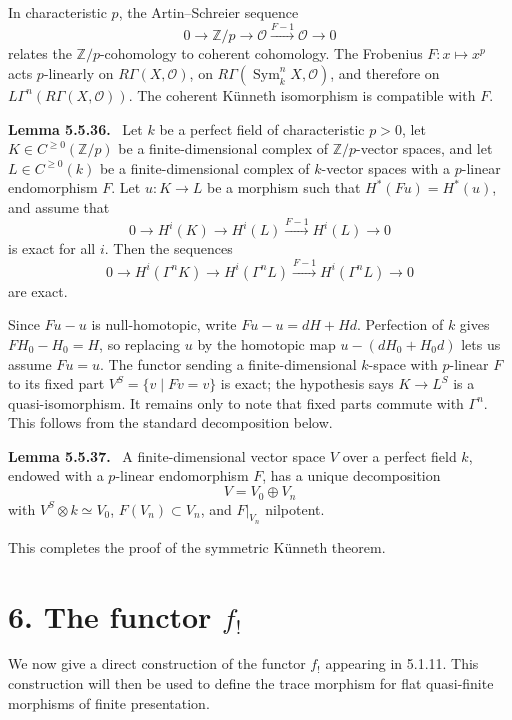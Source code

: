 \documentclass[12pt]{article}
\newcommand{\Oo}{\mathcal O}
\newcommand{\Zz}{\mathbb Z}
\DeclareMathOperator{\Sym}{Sym}
\newenvironment{statement}[1]{\par\medskip\noindent\textbf{#1.}\ }{\par\medskip}
\begin{document}
In characteristic \(p\), the Artin--Schreier sequence
\[
0\to \Zz/p\to\Oo\xrightarrow{F-1}\Oo\to0
\]
relates the \(\Zz/p\)-cohomology to coherent cohomology. The Frobenius \(F:x\mapsto x^p\) acts \(p\)-linearly on \(R\Gamma(X,\Oo)\), on \(R\Gamma(\Sym^n_kX,\Oo)\), and therefore on \(L\Gamma^n(R\Gamma(X,\Oo))\). The coherent K\"unneth isomorphism is compatible with \(F\).

\begin{statement}{Lemma 5.5.36}
Let \(k\) be a perfect field of characteristic \(p>0\), let \(K\in C^{\ge0}(\Zz/p)\) be a finite-dimensional complex of \(\Zz/p\)-vector spaces, and let \(L\in C^{\ge0}(k)\) be a finite-dimensional complex of \(k\)-vector spaces with a \(p\)-linear endomorphism \(F\). Let \(u:K\to L\) be a morphism such that \(H^*(Fu)=H^*(u)\), and assume that
\[
0\to H^i(K)\to H^i(L)\xrightarrow{F-1}H^i(L)\to0
\]
is exact for all \(i\). Then the sequences
\[
0\to H^i(\Gamma^nK)\to H^i(\Gamma^nL)\xrightarrow{F-1}H^i(\Gamma^nL)\to0
\]
are exact.
\end{statement}

Since \(Fu-u\) is null-homotopic, write \(Fu-u=dH+Hd\). Perfection of \(k\) gives \(FH_0-H_0=H\), so replacing \(u\) by the homotopic map \(u-(dH_0+H_0d)\) lets us assume \(Fu=u\). The functor sending a finite-dimensional \(k\)-space with \(p\)-linear \(F\) to its fixed part \(V^S=\{v\mid Fv=v\}\) is exact; the hypothesis says \(K\to L^S\) is a quasi-isomorphism. It remains only to note that fixed parts commute with \(\Gamma^n\). This follows from the standard decomposition below.

\begin{statement}{Lemma 5.5.37}
A finite-dimensional vector space \(V\) over a perfect field \(k\), endowed with a \(p\)-linear endomorphism \(F\), has a unique decomposition
\[
V=V_0\oplus V_n
\]
with \(V^S\otimes k\simeq V_0\), \(F(V_n)\subset V_n\), and \(F|_{V_n}\) nilpotent.
\end{statement}

This completes the proof of the symmetric K\"unneth theorem.

\section*{6. The functor \(f_!\)}

We now give a direct construction of the functor \(f_!\) appearing in 5.1.11. This construction will then be used to define the trace morphism for flat quasi-finite morphisms of finite presentation.
\end{document}
